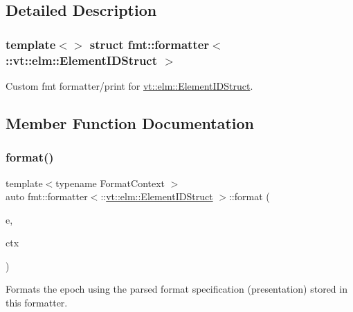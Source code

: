 \subsection{Detailed Description}
\subsubsection*{template$<$$>$\newline
struct fmt\+::formatter$<$\+::vt\+::elm\+::\+Element\+I\+D\+Struct $>$}

Custom fmt formatter/print for {\ttfamily \hyperlink{structvt_1_1elm_1_1_element_i_d_struct}{vt\+::elm\+::\+Element\+I\+D\+Struct}}. 

\subsection{Member Function Documentation}
\mbox{\label{structfmt_1_1formatter_3_1_1vt_1_1elm_1_1_element_i_d_struct_01_4_a2b6b6f1e2222550b5ce165881cfb1448}} 
\subsubsection{\texorpdfstring{format()}{format()}}
{\footnotesize\ttfamily template$<$typename Format\+Context $>$ \\
auto fmt\+::formatter$<$\+::\hyperlink{structvt_1_1elm_1_1_element_i_d_struct}{vt\+::elm\+::\+Element\+I\+D\+Struct} $>$\+::format (\begin{DoxyParamCaption}\item[{\+::\hyperlink{structvt_1_1elm_1_1_element_i_d_struct}{vt\+::elm\+::\+Element\+I\+D\+Struct} const \&}]{e,  }\item[{Format\+Context \&}]{ctx }\end{DoxyParamCaption})\hspace{0.3cm}{\ttfamily [inline]}}

Formats the epoch using the parsed format specification (presentation) stored in this formatter. \mbox{\label{structfmt_1_1formatter_3_1_1vt_1_1elm_1_1_element_i_d_struct_01_4_af147b664199916fcbb5c2c1d69c0bac6}} 

